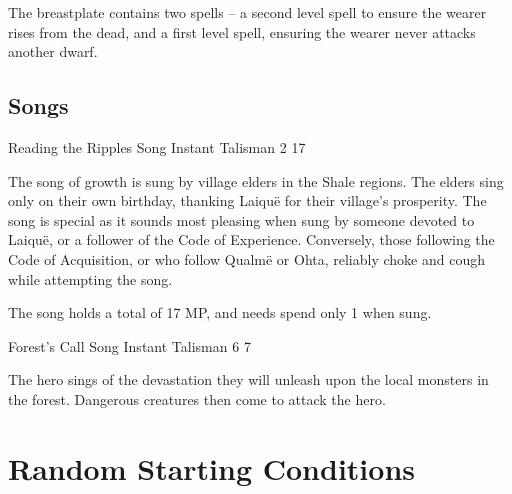 \begin{multicols}{2}
The breastplate contains two spells -- a second level spell to ensure the wearer rises from the dead, and a first level spell, ensuring the wearer never attacks another dwarf.

\subsection{Songs}

\label{chokingsong}

	{Reading the Ripples}%
	{Song}%
	{Instant}%
	{Talisman}%
	{2}%
	{17}%

The song of growth is sung by village elders in the Shale regions.
The elders sing only on their own birthday, thanking Laiqu\"{e} for their village's prosperity.
The song is special as it sounds most pleasing when sung by someone devoted to Laiqu\"{e}, or a follower of the Code of Experience.
Conversely, those following the Code of Acquisition, or who follow Qualm\"{e} or Ohta, reliably choke and cough while attempting the song.

The song holds a total of 17 MP, and needs spend only 1 when sung.

	{Forest's Call}%
	{Song}%
	{Instant}%
	{Talisman}%
	{6}%
	{7}%

\label{medalofheroism}

The hero sings of the devastation they will unleash upon the local monsters in the forest.
Dangerous creatures then come to attack the hero.

\end{multicols}

\section{Random Starting Conditions}

